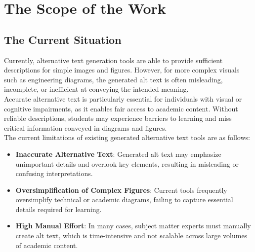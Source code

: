\documentclass[12pt]{article}
\begin{document}
\section{The Scope of the Work}
\subsection{The Current Situation}
Currently, alternative text generation tools are able to provide sufficient descriptions for simple images and figures. However, for more complex visuals 
such as engineering diagrams, the generated alt text is often misleading, incomplete, or inefficient at conveying the intended meaning.\\
Accurate alternative text is particularly essential for individuals with visual or cognitive impairments, as it enables fair access to academic content. Without 
reliable descriptions, students may experience barriers to learning and miss critical information conveyed in diagrams and figures.\\
The current limitations of existing generated alternative text tools are as follows:
\begin{itemize}
  \item \textbf{Inaccurate Alternative Text}: Generated alt text may emphasize unimportant details and overlook key elements, 
  resulting in misleading or confusing interpretations.
  \item \textbf{Oversimplification of Complex Figures}: Current tools frequently oversimplify technical or academic diagrams, 
  failing to capture essential details required for learning.
  \item \textbf{High Manual Effort}: In many cases, subject matter experts must manually create alt text, 
  which is time-intensive and not scalable across large volumes of academic content.
\end{itemize}
\end{document}
